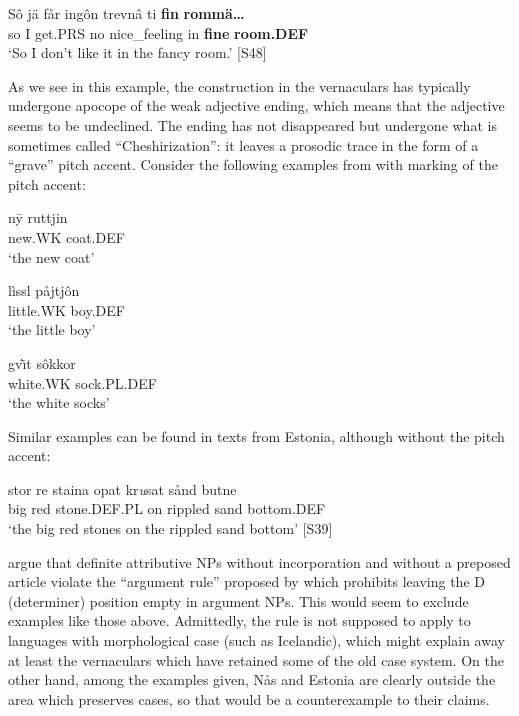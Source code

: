 \ea\label{}
\gll Sô  jä  får  ingôn  trevnâ  ti  \textbf{fin} \textbf{rommä…}\\
so  I  get.PRS  no  nice\_feeling  in  \textbf{fine} \textbf{room.DEF}\\
\glt ‘So I don’t like it in the fancy room.’ [S48]
\z

As we see in this example, the construction in the vernaculars has typically undergone apocope of the weak adjective ending, which means that the adjective seems to be undeclined. The ending has not disappeared but undergone what is sometimes called “Cheshirization”: it leaves a prosodic trace in the form of a “grave” pitch accent. Consider the following examples from \citet[148]{Levander1928} with marking of the pitch accent:

\ea\label{}
\gll n\={y}{\textasciigrave}  ruttjin\\
new.WK  coat.DEF\\
\glt ‘the new coat’
\z

\ea\label{}
\gll lìssl  påjtjôn\\
little.WK  boy.DEF\\
\glt ‘the little boy’
\z

\ea\label{}
\gll gv\`{\=\i}t  sôkkor\\
white.WK  sock.PL.DEF\\
\glt ‘the white socks’
\z

Similar examples can be found in texts from Estonia, although without the pitch accent:

\ea\label{}
\gll stor  re  staina  opat  kr\textit{u}sat  sånd  butne\\
big  red  stone.DEF.PL  on  rippled  sand  bottom.DEF\\
\glt ‘the big red stones on the rippled sand bottom’ [S39]
\z

\citet[110]{SandströmEtAl2003} argue that definite attributive NPs without incorporation and without a preposed article violate the “argument rule” proposed by \citet{Delsing1993} which prohibits leaving the D (determiner) position empty in argument NPs. This would seem to exclude examples like those above. Admittedly, the rule is not supposed to apply to languages with morphological case (such as Icelandic), which might explain away at least the vernaculars which have retained some of the old case system. On the other hand, among the examples given, Nås and Estonia are clearly outside the area which preserves cases, so that would be a counterexample to their claims. 

